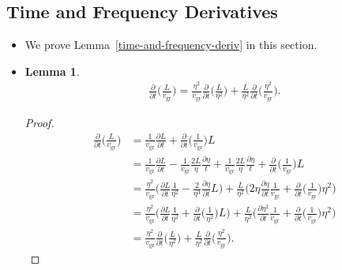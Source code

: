 \documentclass[10pt]{article}
\newtheorem{lemma}{Lemma}[section]
\newcommand{\group}{\mathrm{gr}}
\begin{document}
  \subsection{Time and Frequency Derivatives}
  \begin{itemize}    
    \item We prove Lemma~\ref{time-and-frequency-deriv} in this section.

    \item \begin{lemma}
      \begin{align*}
        \frac{\partial}{\partial t} \bigg( \frac{L}{v_\group} \bigg)
        = \frac{\eta^2}{v_\group} \frac{\partial}{\partial t} \bigg( \frac{L}{\eta^2} \bigg)
        + \frac{L}{\eta^2} \frac{\partial}{\partial t} \bigg( \frac{\eta^2}{v_\group} \bigg).
      \end{align*}
    \end{lemma}
    \begin{proof}
      \begin{align*}
        \frac{\partial}{\partial t} \bigg( \frac{L}{v_\group} \bigg)
        &= \frac{1}{v_\group} \frac{\partial L}{\partial t} 
        + \frac{\partial}{\partial t} \bigg( \frac{1}{v_\group} \bigg)L\\
        &= \frac{1}{v_\group} \frac{\partial L}{\partial t} 
        - \frac{1}{v_\group}\frac{2L}{\eta} \frac{\partial \eta}{t}
        + \frac{1}{v_\group}\frac{2L}{\eta} \frac{\partial \eta}{t}
        + \frac{\partial}{\partial t} \bigg( \frac{1}{v_\group} \bigg)L\\  
        &= \frac{\eta^2}{v_\group} \bigg( \frac{\partial L}{\partial t} \frac{1}{\eta^2} 
        - \frac{2}{\eta^3} \frac{\partial \eta}{\partial t} L \bigg)
        + \frac{L}{\eta^2} \bigg( 2\eta \frac{\partial \eta}{\partial t} \frac{1}{v_\group}
        + \frac{\partial}{\partial t} \bigg( \frac{1}{v_\group} \bigg)\eta^2
        \bigg)\\
        &= \frac{\eta^2}{v_\group} \bigg( \frac{\partial L}{\partial t} \frac{1}{\eta^2} 
        + \frac{\partial}{\partial t} \bigg( \frac{1}{\eta^2} \bigg) L \bigg)
        + \frac{L}{\eta^2} \bigg( \frac{\partial \eta^2}{\partial t} \frac{1}{v_\group}
        + \frac{\partial}{\partial t} \bigg( \frac{1}{v_\group} \bigg)\eta^2
        \bigg)\\
        &= \frac{\eta^2}{v_\group} \frac{\partial}{\partial t} \bigg( \frac{L}{\eta^2} \bigg)
        + \frac{L}{\eta^2} \frac{\partial}{\partial t} \bigg( \frac{\eta^2}{v_\group}
        \bigg).
      \end{align*}
    \end{proof}


\end{itemize}
\end{document}
